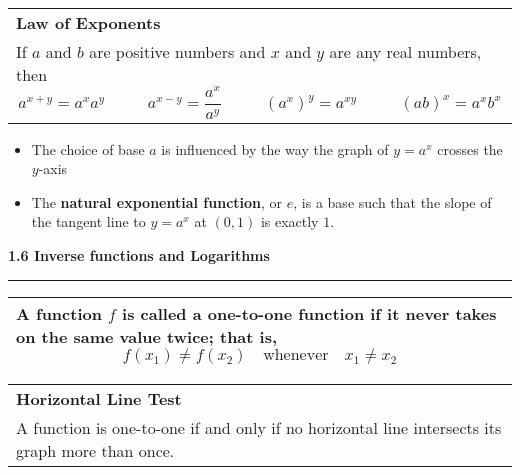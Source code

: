 \documentclass[fleqn]{article}
\begin{document}
\begin{center}
\def\arraystretch{1.3}
{\setlength{\tabcolsep}{16pt}
\begin{tabularx}{.9\textwidth}{|X|}
\hline
	\vspace{1pt}
	\textbf{Law of Exponents} \\[6pt]
	If $a$ and $b$ are positive numbers and $x$ and $y$ are any real numbers, then
	$$a^{x+y} = a^x a^y \hspace{32pt} a^{x-y} = \dfrac{a^x}{a^y} \hspace{32pt} (a^x)^y = a^{xy} \hspace{32pt} (ab)^x = a^xb^x$$
	\\	
\hline
\end{tabularx}}
\vspace{12pt}

\begin{itemize}
	\item The choice of base $a$ is influenced by the way the graph of $y = a^x$ crosses the $y$-axis
	\item The \textbf{natural exponential function}, or $e$, is a base such that the slope of the tangent line to $y = a^x$ at $(0,1)$ is exactly $1$.
\end{itemize}

\vspace{36pt}	

\Large\textbf{1.6 Inverse functions and Logarithms}

\noindent\hfill\rule{0.3\textwidth}{.4pt}\hfill
\vspace{12pt}

\large
\def\arraystretch{1.3}
{\setlength{\tabcolsep}{16pt}
\begin{tabularx}{.9\textwidth}{|X|}
\hline
	\vspace{1pt}
	A function $f$ is called a \textbf{one-to-one function} if it never takes on the same value twice; that is, 
	$$f(x_1) \ne f(x_2) \hspace{12pt} \text{whenever} \hspace{12pt} x_1 \ne x_2$$
	\\	
\hline
\end{tabularx}}
\vspace{12pt}

\def\arraystretch{1.3}
{\setlength{\tabcolsep}{16pt}
\begin{tabularx}{.9\textwidth}{|X|}
\hline
	\vspace{1pt}
	\textbf{Horizontal Line Test} \\
	A function is one-to-one if and only if no horizontal line intersects its graph more than once.
	\\[12pt]	
\hline
\end{tabularx}}
\vspace{12pt}


\end{center}
\end{document}
